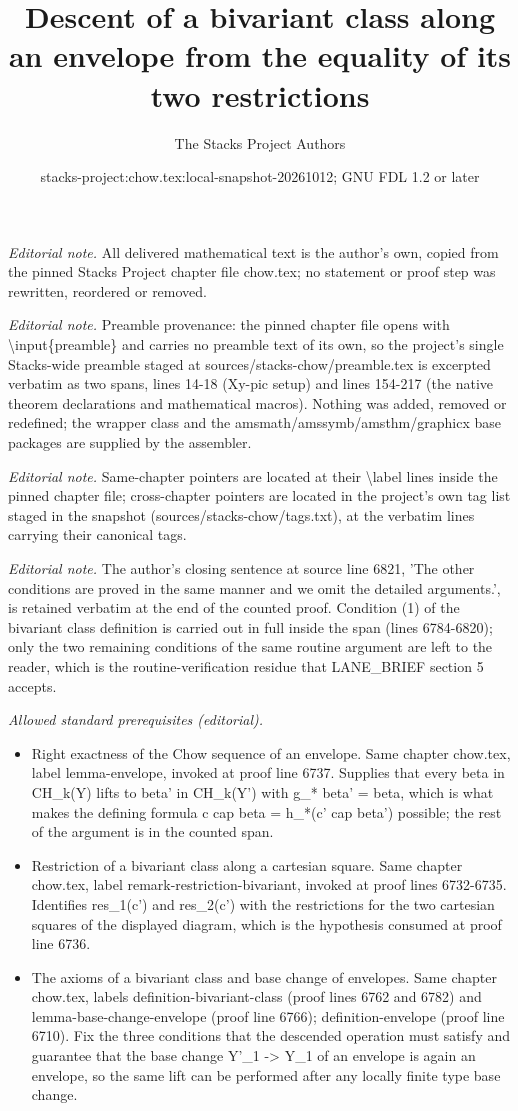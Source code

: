 \documentclass[10pt,a4paper]{amsart}
\title{Descent of a bivariant class along an envelope from the equality of its two restrictions}
\author{The Stacks Project Authors}
\date{stacks-project:chow.tex:local-snapshot-20261012; GNU FDL 1.2 or later}
\theoremstyle{plain}
\theoremstyle{definition}
\theoremstyle{remark}
\numberwithin{equation}{subsection}
\begin{document}
\maketitle
\noindent\textit{Editorial note.} All delivered mathematical text is the author's own, copied from the pinned Stacks Project chapter file chow.tex; no statement or proof step was rewritten, reordered or removed.\par\medskip
\noindent\textit{Editorial note.} Preamble provenance: the pinned chapter file opens with \textbackslash{}input\{preamble\} and carries no preamble text of its own, so the project's single Stacks-wide preamble staged at sources/stacks-chow/preamble.tex is excerpted verbatim as two spans, lines 14-18 (Xy-pic setup) and lines 154-217 (the native theorem declarations and mathematical macros). Nothing was added, removed or redefined; the wrapper class and the amsmath/amssymb/amsthm/graphicx base packages are supplied by the assembler.\par\medskip
\noindent\textit{Editorial note.} Same-chapter pointers are located at their \textbackslash{}label lines inside the pinned chapter file; cross-chapter pointers are located in the project's own tag list staged in the snapshot (sources/stacks-chow/tags.txt), at the verbatim lines carrying their canonical tags.\par\medskip
\noindent\textit{Editorial note.} The author's closing sentence at source line 6821, 'The other conditions are proved in the same manner and we omit the detailed arguments.', is retained verbatim at the end of the counted proof. Condition (1) of the bivariant class definition is carried out in full inside the span (lines 6784-6820); only the two remaining conditions of the same routine argument are left to the reader, which is the routine-verification residue that LANE\_BRIEF section 5 accepts.\par\medskip
\noindent\textit{Allowed standard prerequisites (editorial).}\begin{itemize}
\item Right exactness of the Chow sequence of an envelope. Same chapter chow.tex, label lemma-envelope, invoked at proof line 6737. Supplies that every beta in CH\_k(Y) lifts to beta' in CH\_k(Y') with g\_* beta' = beta, which is what makes the defining formula c cap beta = h\_*(c' cap beta') possible; the rest of the argument is in the counted span.
\item Restriction of a bivariant class along a cartesian square. Same chapter chow.tex, label remark-restriction-bivariant, invoked at proof lines 6732-6735. Identifies res\_1(c') and res\_2(c') with the restrictions for the two cartesian squares of the displayed diagram, which is the hypothesis consumed at proof line 6736.
\item The axioms of a bivariant class and base change of envelopes. Same chapter chow.tex, labels definition-bivariant-class (proof lines 6762 and 6782) and lemma-base-change-envelope (proof line 6766); definition-envelope (proof line 6710). Fix the three conditions that the descended operation must satisfy and guarantee that the base change Y'\_1 -> Y\_1 of an envelope is again an envelope, so the same lift can be performed after any locally finite type base change.
\end{itemize}\medskip
\end{document}
